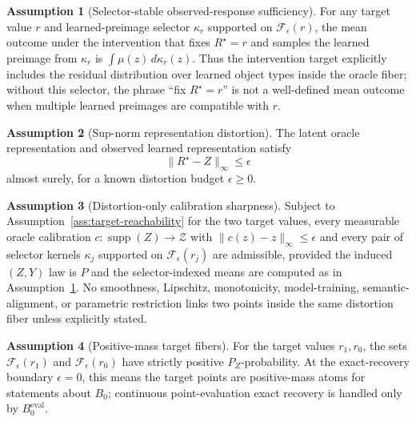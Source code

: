 \documentclass[11pt]{article}
\theoremstyle{definition}
\newtheorem{assumption}{Assumption}
\theoremstyle{plain}
\theoremstyle{remark}
\begin{document}
\begin{assumption}[Selector-stable observed-response sufficiency]\label{ass:selector-sufficiency}
For any target value \(r\) and learned-preimage selector \(\kappa_r\) supported on \(\mathcal F_\epsilon(r)\), the mean outcome under the intervention that fixes \(R^\star=r\) and samples the learned preimage from \(\kappa_r\) is \(\int\mu(z)\,d\kappa_r(z)\).  Thus the intervention target explicitly includes the residual distribution over learned object types inside the oracle fiber; without this selector, the phrase ``fix \(R^\star=r\)'' is not a well-defined mean outcome when multiple learned preimages are compatible with \(r\).
\end{assumption}

\begin{assumption}[Sup-norm representation distortion]\label{ass:distortion}
The latent oracle representation and observed learned representation satisfy
\[
\|R^\star-Z\|_\infty\le\epsilon
\]
almost surely, for a known distortion budget \(\epsilon\ge0\).
\end{assumption}

\begin{assumption}[Distortion-only calibration sharpness]\label{ass:distortion-sharpness}
Subject to Assumption~\ref{ass:target-reachability} for the two target values, every measurable oracle calibration \(c:\operatorname{supp}(Z)\to\mathcal Z\) with \(\|c(z)-z\|_\infty\le\epsilon\) and every pair of selector kernels \(\kappa_j\) supported on \(\mathcal F_\epsilon(r_j)\) are admissible, provided the induced \((Z,Y)\) law is \(P\) and the selector-indexed means are computed as in Assumption~\ref{ass:selector-sufficiency}.  No smoothness, Lipschitz, monotonicity, model-training, semantic-alignment, or parametric restriction links two points inside the same distortion fiber unless explicitly stated.
\end{assumption}

\begin{assumption}[Positive-mass target fibers]\label{ass:nonempty-fibers}
For the target values \(r_1,r_0\), the sets \(\mathcal F_\epsilon(r_1)\) and \(\mathcal F_\epsilon(r_0)\) have strictly positive \(P_Z\)-probability.  At the exact-recovery boundary \(\epsilon=0\), this means the target points are positive-mass atoms for statements about \(B_0\); continuous point-evaluation exact recovery is handled only by \(B^{\mathrm{eval}}_0\).
\end{assumption}
\end{document}
